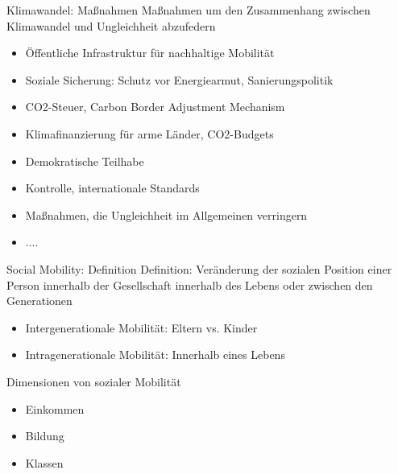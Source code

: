 \documentclass[aspectratio=169,xcolor=dvipsnames]{beamer}
\begin{document}
\begin{frame}{Klimawandel: Maßnahmen}
    Maßnahmen um den Zusammenhang zwischen Klimawandel und Ungleichheit abzufedern
    \begin{itemize}
        \item Öffentliche Infrastruktur für nachhaltige Mobilität
        \item Soziale Sicherung: Schutz vor Energiearmut, Sanierungspolitik
        \item CO2-Steuer, Carbon Border Adjustment Mechanism
        \item Klimafinanzierung für arme Länder, CO2-Budgets
        \item Demokratische Teilhabe
        \item Kontrolle, internationale Standards
        \item Maßnahmen, die Ungleichheit im Allgemeinen verringern
        \item ....
    \end{itemize}
\end{frame}

\begin{frame}[label = social-mobility]{Social Mobility: Definition}
    Definition: Veränderung der sozialen Position einer Person innerhalb der Gesellschaft innerhalb des Lebens oder zwischen den Generationen
    \pause
    \begin{itemize}
        \item Intergenerationale Mobilität: Eltern vs. Kinder
        \item Intragenerationale Mobilität: Innerhalb eines Lebens
    \end{itemize}

    \vspace{0.5cm}
    \pause
    Dimensionen von sozialer Mobilität
    \begin{itemize}
        \item Einkommen \hyperlink{einkommensmobilitaet}{}
        \item Bildung \hyperlink{bildungsmobilitaet}{}
        \item Klassen
    \end{itemize}


\end{frame}
\end{document}
